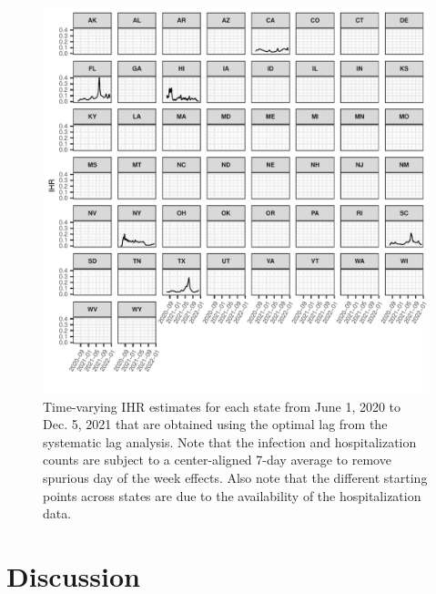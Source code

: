 \documentclass{article}
\begin{document}
\begin{figure}[!tb]
\centering
    \includegraphics[width=.99\textwidth]{IHR_7dav.pdf} 
    \caption{Time-varying IHR estimates for each state from June 1, 2020 to Dec. 5, 2021 
    that are obtained using the optimal lag from the systematic lag analysis. 
    Note that the infection and hospitalization counts are subject to a 
    center-aligned 7-day average to remove spurious day of the week effects. 
    Also note that the different starting points across states are due to the 
    availability of the hospitalization data.}
    \label{fig:IHR_7dav}
\end{figure}

\section{Discussion}
\end{document}
